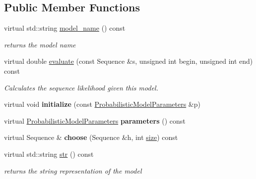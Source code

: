\subsection*{Public Member Functions}
\begin{DoxyCompactItemize}
\item 
\mbox{\label{classtops_1_1MaximumDependenceDecomposition_ad6f673b250e49a13d396ee9b011eef48}} 
virtual std\+::string \hyperlink{classtops_1_1MaximumDependenceDecomposition_ad6f673b250e49a13d396ee9b011eef48}{model\+\_\+name} () const
\begin{DoxyCompactList}\small\item\em returns the model name \end{DoxyCompactList}\item 
\mbox{\label{classtops_1_1MaximumDependenceDecomposition_a659d57f73f26ef313f86055ea0ffcd94}} 
virtual double \hyperlink{classtops_1_1MaximumDependenceDecomposition_a659d57f73f26ef313f86055ea0ffcd94}{evaluate} (const Sequence \&s, unsigned int begin, unsigned int end) const
\begin{DoxyCompactList}\small\item\em Calculates the sequence likelihood given this model. \end{DoxyCompactList}\item 
\mbox{\label{classtops_1_1MaximumDependenceDecomposition_af374e56c6b244b293fa74c132b8048b8}} 
virtual void {\bfseries initialize} (const \hyperlink{classtops_1_1ProbabilisticModelParameters}{Probabilistic\+Model\+Parameters} \&p)
\item 
\mbox{\label{classtops_1_1MaximumDependenceDecomposition_a8797d44dec6e7fac9d083d1dc7130411}} 
virtual \hyperlink{classtops_1_1ProbabilisticModelParameters}{Probabilistic\+Model\+Parameters} {\bfseries parameters} () const
\item 
\mbox{\label{classtops_1_1MaximumDependenceDecomposition_a10eb60feb597b65dc95ef2087b84ca57}} 
virtual Sequence \& {\bfseries choose} (Sequence \&h, int \hyperlink{classtops_1_1ProbabilisticModel_a4e3910e9b9b848b7078e7101909ae82a}{size}) const
\item 
\mbox{\label{classtops_1_1MaximumDependenceDecomposition_ab644af2e93549fbbce332bc426e67559}} 
virtual std\+::string \hyperlink{classtops_1_1MaximumDependenceDecomposition_ab644af2e93549fbbce332bc426e67559}{str} () const
\begin{DoxyCompactList}\small\item\em returns the string representation of the model \end{DoxyCompactList}\end{DoxyCompactItemize}


